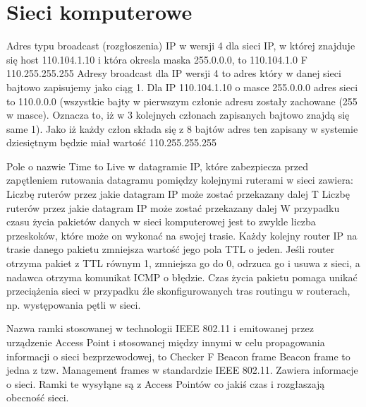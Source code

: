 \chapter{Sieci komputerowe}
\PartialToc
\answer
{Adres typu broadcast (rozgłoszenia) IP w wersji 4 dla sieci IP, w której
znajduje się host 110.104.1.10 i która okresla maska 255.0.0.0, to}
{110.104.1.0}
{F} %
{110.255.255.255}
{Adresy broadcast dla IP wersji 4 to adres który w danej sieci bajtowo zapisujemy jako ciąg 1. 
Dla IP 110.104.1.10 o masce 255.0.0.0 adres sieci to 110.0.0.0 (wszystkie bajty w pierwszym członie adresu zostały zachowane (255 w masce). Oznacza to, iż w 3 kolejnych członach zapisanych bajtowo znajdą się same 1). Jako iż każdy człon składa się z 8 bajtów adres ten zapisany w systemie dziesiętnym będzie miał wartość 110.255.255.255 }

\answer
{Pole o nazwie Time to Live w datagramie IP, które zabezpiecza przed zapętleniem rutowania datagramu pomiędzy kolejnymi ruterami w sieci zawiera:}
{Liczbę ruterów przez jakie datagram IP może zostać przekazany dalej }
{T} %
{Liczbę ruterów przez jakie datagram IP może zostać przekazany dalej }
{W przypadku czasu życia pakietów danych w sieci komputerowej jest to zwykle liczba przeskoków, które może on wykonać na swojej trasie. Każdy kolejny router IP na trasie danego pakietu zmniejsza wartość jego pola TTL o jeden. Jeśli router otrzyma pakiet z TTL równym 1, zmniejsza go do 0, odrzuca go i usuwa z sieci, a nadawca otrzyma komunikat ICMP o błędzie. Czas życia pakietu pomaga unikać przeciążenia sieci w przypadku źle skonfigurowanych tras routingu w routerach, np. występowania pętli w sieci.}

\answer
{Nazwa ramki stosowanej w technologii IEEE 802.11 i emitowanej przez
urządzenie Access Point i stosowanej między innymi w celu propagowania informacji o sieci bezprzewodowej,
to}
{Checker}
{F} %
{Beacon frame }
{Beacon frame to jedna z tzw. Management frames w standardzie IEEE 802.11. Zawiera informacje o sieci. Ramki te wysyłąne są z Access Pointów co jakiś czas i rozgłaszają obecność sieci.}

